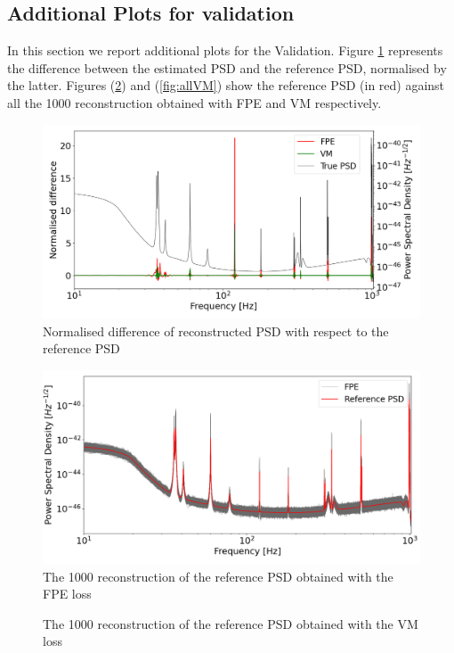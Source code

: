\documentclass[epj,nopacs]{svjour}
\begin{document}
\begin{appendix}
\section{Additional Plots for validation}\label{sec:AdditionalPlots}
In this section we report additional plots for the Validation. Figure \ref{fig:NormalisedDifference} represents the difference between the estimated PSD and the reference PSD, normalised by the latter. Figures (\ref{fig:allFPE}) and (\ref{fig:allVM}) show the reference PSD (in red) against all the 1000 reconstruction obtained with FPE and VM respectively. 
\begin{figure}[H]
	\caption{Normalised difference of reconstructed PSD with respect to the reference PSD}
	\label{fig:NormalisedDifference}
	\includegraphics[width=\linewidth,keepaspectratio]{Images/Plots/Normalised_residuals}
\end{figure}
\begin{figure}[H]
	\caption{The 1000 reconstruction of the reference PSD obtained with the FPE loss}
	\label{fig:allFPE}
	\includegraphics[width=\linewidth,keepaspectratio]{Images/Plots/All_FPEs}
\end{figure}
\begin{figure}[H]
	\caption{The 1000 reconstruction of the reference PSD obtained with the VM loss}

\end{figure}
\end{appendix}
\end{document}
